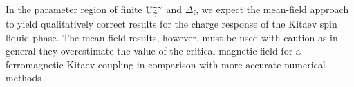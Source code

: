 In the parameter region of finite  $\mathrm{U}_\gamma^{\gamma\gamma}$ and $\Delta_{\mathrm f}$,  we expect the mean-field approach to yield qualitatively correct results for the charge response of the Kitaev spin liquid phase. The mean-field results, however, must be used with caution as in general they overestimate the value of the critical magnetic field for a ferromagnetic Kitaev coupling in comparison with more accurate numerical methods \cite{Zhu2018,Hickey2019,Gordon2019,Kim2020}.
